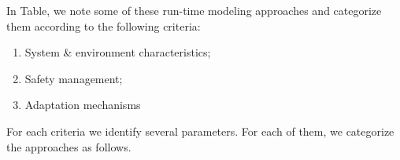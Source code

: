 \documentclass[journal]{IEEEtran}
\theoremstyle{definition}
\newcommand\darko[1]{\nb{Darko}{#1}}
\newcommand\patrizio[1]{\nb{Patrizio}{#1}}
\newcommand\ivano[1]{\nb{Ivano}{#1}}
\begin{document}
In Table, we note some of these run-time modeling approaches and categorize them according to the following criteria:
\begin{enumerate}
\item System \& environment characteristics;
\item Safety management;
\item Adaptation mechanisms
\end{enumerate}




For each criteria we identify several parameters.%
For each of them, we categorize the approaches as follows.
\end{document}
